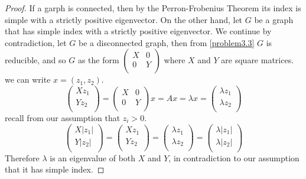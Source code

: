 \documentclass[a4paper, 11pt, oneside]{article}
\newcommand\abs[1]{\left|#1\right|}
\begin{document}
\begin{proof}
If a garph is connected, then by the Perron-Frobenius Theorem \cite{perron_frobenius} its index is simple with a strictly positive eigenvector.
On the other hand, let $G$ be a graph that has simple index with a strictly positive eigenvector.
We continue by contradiction, let $G$ be a disconnected graph, then from \ref{problem3.3} $G$ is reducible, and so $G$ as the form
$\begin{pmatrix}
X & 0 \\ 
0 & Y \\ 
\end{pmatrix}$
where $X$ and $Y$ are square matrices. we can write $x = (z_1,z_2)$.
\begin{equation*}
\begin{pmatrix}
X z_1 \\ 
Y z_2\\ 
\end{pmatrix} =
\begin{pmatrix}
X & 0 \\ 
0 & Y \\ 
\end{pmatrix} x = Ax = \lambda x =
\begin{pmatrix}
\lambda z_1 \\ 
\lambda z_2\\ 
\end{pmatrix}
\end{equation*}
recall from our assumption that $z_i > 0$.
\begin{equation*}
\begin{pmatrix}
X \abs{z_1} \\ 
Y \abs{z_2}\\ 
\end{pmatrix} =
\begin{pmatrix}
X z_1 \\ 
Y z_2\\ 
\end{pmatrix} =
\begin{pmatrix}
\lambda z_1 \\ 
\lambda z_2\\ 
\end{pmatrix} =
\begin{pmatrix}
\lambda \abs{z_1} \\ 
\lambda \abs{z_2}\\ 
\end{pmatrix}
\end{equation*}
Therefore $\lambda$ is an eigenvalue of both $X$ and $Y$, in contradiction to our assumption that it has simple index.
\end{proof}
\end{document}
